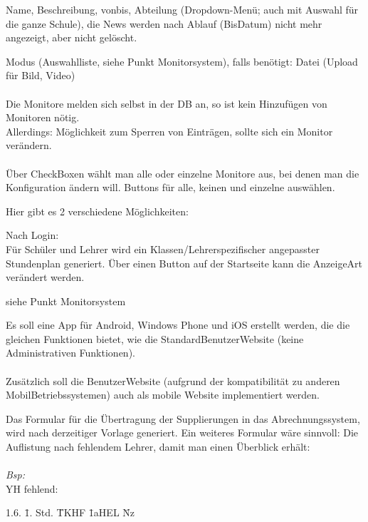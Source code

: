 \begin{description}[style=nextline]
	\item[News]
		Name, Beschreibung, von­bis, Abteilung (Dropdown-­Menü; auch mit Auswahl für die ganze Schule), die News werden nach Ablauf (Bis­Datum) nicht mehr angezeigt, aber nicht gelöscht.
	\item[Monitore]
		Modus (Auswahlliste, siehe Punkt Monitorsystem), falls benötigt: Datei (Upload für Bild, Video)\\
		\\
		Die Monitore melden sich selbst in der DB an, so ist kein Hinzufügen von Monitoren nötig. \\
		Allerdings: Möglichkeit zum Sperren von Einträgen, sollte sich ein Monitor verändern.\\
		\\
		Über Check­Boxen wählt man alle oder einzelne Monitore aus, bei denen man die Konfiguration ändern will. Buttons für alle, keinen und einzelne auswählen.
	 \item[Ausgabe]
	 	Hier gibt es 2 verschiedene Möglichkeiten:
	 	\begin{description}[style=nextline]
	 		\item[Benutzer-Website/App]
	 			Nach Login:\\
	 			Für Schüler und Lehrer wird ein Klassen­/Lehrer­spezifischer angepasster Stundenplan generiert. Über einen Button auf der Startseite kann die Anzeige­Art verändert werden.
	 		\item[Monitore]
	 			siehe Punkt Monitorsystem
	 	\end{description}
	\item[App]
		Es soll eine App für Android, Windows Phone und iOS erstellt werden, die die gleichen Funktionen bietet, wie die Standard­Benutzer­Website (keine Administrativen Funktionen).\\
		\\
		Zusätzlich soll die Benutzer­Website (aufgrund der kompatibilität zu anderen Mobil­Betriebssystemen) auch als mobile Website implementiert werden.
	 \item[Formular]
	 	Das Formular für die Übertragung der Supplierungen in das Abrechnungssystem, wird nach derzeitiger Vorlage generiert. Ein weiteres Formular wäre sinnvoll: Die Auflistung nach fehlendem Lehrer, damit man einen Überblick erhält:\\
	 	\\
	 	\textit{Bsp:}\\
	 	YH fehlend:
\begin{tabbing}
1.6. \= 1. Std. \= TKHF \= 1aHEL \hspace{2em} \= Nz\\

\end{tabbing}
\end{description}
